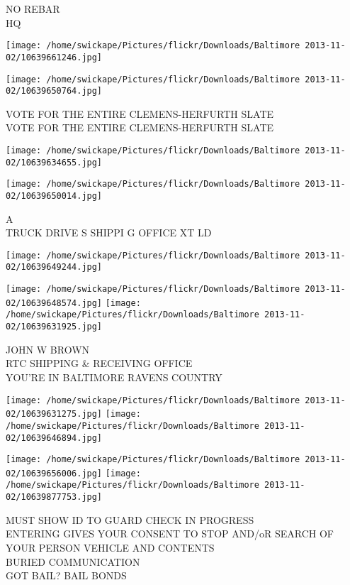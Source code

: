 \documentclass[10pt,letterpaper]{article}
\begin{document}
NO REBAR\\
HQ\\
\pagebreak

\texttt{[image: /home/swickape/Pictures/flickr/Downloads/Baltimore 2013-11-02/10639661246.jpg]}

\vspace{0.25in}
\texttt{[image: /home/swickape/Pictures/flickr/Downloads/Baltimore 2013-11-02/10639650764.jpg]}

VOTE FOR THE ENTIRE CLEMENS{-}HERFURTH SLATE\\
VOTE FOR THE ENTIRE CLEMENS{-}HERFURTH SLATE\\
\pagebreak

\texttt{[image: /home/swickape/Pictures/flickr/Downloads/Baltimore 2013-11-02/10639634655.jpg]}

\vspace{0.25in}
\texttt{[image: /home/swickape/Pictures/flickr/Downloads/Baltimore 2013-11-02/10639650014.jpg]}

A\\
TRUCK DRIVE S SHIPPI G OFFICE XT LD\\
\pagebreak

\texttt{[image: /home/swickape/Pictures/flickr/Downloads/Baltimore 2013-11-02/10639649244.jpg]}

\vspace{0.25in}
\texttt{[image: /home/swickape/Pictures/flickr/Downloads/Baltimore 2013-11-02/10639648574.jpg]}
\texttt{[image: /home/swickape/Pictures/flickr/Downloads/Baltimore 2013-11-02/10639631925.jpg]}

JOHN W BROWN\\
RTC SHIPPING \& RECEIVING OFFICE\\
YOU'RE IN BALTIMORE RAVENS COUNTRY\\
\pagebreak

\texttt{[image: /home/swickape/Pictures/flickr/Downloads/Baltimore 2013-11-02/10639631275.jpg]}
\texttt{[image: /home/swickape/Pictures/flickr/Downloads/Baltimore 2013-11-02/10639646894.jpg]}

\texttt{[image: /home/swickape/Pictures/flickr/Downloads/Baltimore 2013-11-02/10639656006.jpg]}
\texttt{[image: /home/swickape/Pictures/flickr/Downloads/Baltimore 2013-11-02/10639877753.jpg]}

MUST SHOW ID TO GUARD CHECK IN PROGRESS\\
ENTERING GIVES YOUR CONSENT TO STOP AND/oR SEARCH OF YOUR PERSON VEHICLE AND CONTENTS\\
BURIED COMMUNICATION\\
GOT BAIL?  BAIL BONDS\\
\pagebreak
\end{document}
